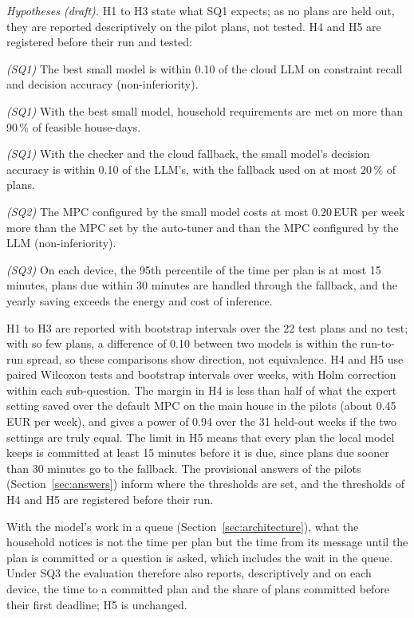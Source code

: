 \documentclass[12pt,a4paper]{report}
\begin{document}
\textit{Hypotheses (draft).} H1 to H3 state what SQ1 expects; as no
plans are held out, they are reported descriptively on the pilot plans,
not tested. H4 and H5 are registered before their run and tested:

\begin{description}[leftmargin=1.4cm, style=sameline, font=\normalfont\bfseries]
\item[H1] \textit{(SQ1)} The best small model is within 0.10 of the
cloud LLM on constraint recall and decision accuracy
(non-inferiority).
\item[H2] \textit{(SQ1)} With the best small model, household
requirements are met on more than 90\,\% of feasible house-days.
\item[H3] \textit{(SQ1)} With the checker and the cloud fallback, the
small model's decision accuracy is within 0.10 of the LLM's, with the
fallback used on at most 20\,\% of plans.
\item[H4] \textit{(SQ2)} The MPC configured by the small model costs at
most 0.20\,EUR per week more than the MPC set by the auto-tuner and
than the MPC configured by the LLM (non-inferiority).
\item[H5] \textit{(SQ3)} On each device, the 95th percentile of the
time per plan is at most 15 minutes, plans due within 30 minutes are
handled through the fallback, and the yearly saving exceeds the energy
and cost of inference.
\end{description}

H1 to H3 are reported with bootstrap intervals over the 22 test plans
and no test; with so few plans, a difference of 0.10 between two models
is within the run-to-run spread, so these comparisons show direction,
not equivalence. H4 and H5 use paired Wilcoxon tests and bootstrap
intervals over weeks, with Holm correction within each sub-question. The margin in H4 is less than half of
what the expert setting saved over the default MPC on the main house in
the pilots (about 0.45\,EUR per week), and gives a power of 0.94 over
the 31 held-out weeks if the two settings are truly equal. The limit in
H5 means that every plan the local model keeps is committed at least
15 minutes before it is due, since plans due sooner than 30 minutes go
to the fallback. The provisional
answers of the pilots (Section~\ref{sec:answers}) inform where the
thresholds are set, and the thresholds of H4 and H5 are registered
before their run.

With the model's work in a queue (Section~\ref{sec:architecture}), what
the household notices is not the time per plan but the time from its
message until the plan is committed or a question is asked, which
includes the wait in the queue. Under SQ3 the evaluation therefore also
reports, descriptively and on each device, the time to a committed plan
and the share of plans committed before their first deadline; H5 is
unchanged.
\end{document}
